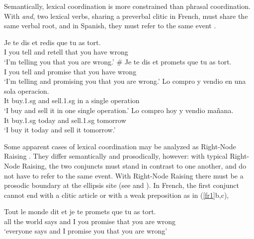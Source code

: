 \documentclass[output=paper
                ,modfonts
                ,nonflat
	        ,collection
	        ,collectionchapter
	        ,collectiontoclongg
 	        ,biblatex
                ,babelshorthands
                ,newtxmath
                ,draftmode
                ,colorlinks, citecolor=brown
]{./langsci/langscibook}
\begin{document}
Semantically, lexical coordination is more constrained than phrasal coordination. With \textit{and}, two lexical verbs, sharing a preverbal clitic in French, must share the same verbal root, and in Spanish, they must refer to the same event \citep{Bosque:86}.

\begin{exe}
 \ex
\begin{xlista}
\ex \gll Je te dis et redis que tu {as tort.} \\
I you tell and retell that you have wrong\\
\glt `I'm telling you that you are wrong.'
\ex \gll \# Je te dis et promets que tu as tort.\\
I you tell and promise that you have wrong\\
\glt `I'm telling and promising you that you are wrong.'
\ex \gll Lo compro y vendio en una sola operacion.\\
It buy.1.{\sc sg} and sell.1.{\sc sg} in a single operation\\
\glt `I buy and sell it in one single operation.'
\ex \gll *Lo compro hoy y vendio ma\~{n}ana.\\
It buy.1.{\sc sg} today and sell.1.{\sc sg} tomorrow \\
\glt `I buy it today and sell it tomorrow.'
\end{xlista}
\end{exe}

Some apparent cases of lexical coordination may be analyzed as Right-Node Raising \citep{Beavers}. They differ semantically and prosodically, however: with typical Right-Node Raising, the two conjuncts must stand in contrast to one another, and do not have to refer to the same event. With Right-Node Raising there must be a prosodic boundary at the ellipsis site (see \citet{chavesrnr} and ). In French, the first conjunct cannot end with a clitic article or with a weak preposition as in (\ref{fr1}b,c),

\begin{exe}
 \ex
\begin{xlista}
\ex  \gll Tout le monde dit et je te promets que tu as tort.\\
 all the world says and I you promise that you are wrong\\
\glt `everyone says and I promise you that you are wrong'
\end{xlista}\label{fr1}
\end{exe}
\end{document}
